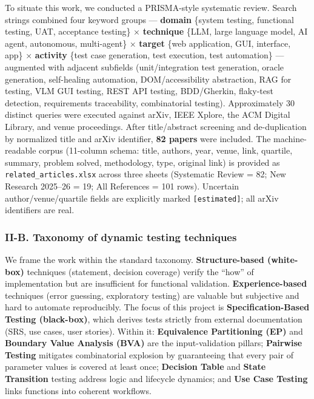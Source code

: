 \documentclass[
]{article}
\begin{document}
To situate this work, we conducted a PRISMA-style systematic review.
Search strings combined four keyword groups --- \textbf{domain} \{system
testing, functional testing, UAT, acceptance testing\} ×
\textbf{technique} \{LLM, large language model, AI agent, autonomous,
multi-agent\} × \textbf{target} \{web application, GUI, interface, app\}
× \textbf{activity} \{test case generation, test execution, test
automation\} --- augmented with adjacent subfields (unit/integration
test generation, oracle generation, self-healing automation,
DOM/accessibility abstraction, RAG for testing, VLM GUI testing, REST
API testing, BDD/Gherkin, flaky-test detection, requirements
traceability, combinatorial testing). Approximately 30 distinct queries
were executed against arXiv, IEEE Xplore, the ACM Digital Library, and
venue proceedings. After title/abstract screening and de-duplication by
normalized title and arXiv identifier, \textbf{82 papers} were included.
The machine-readable corpus (11-column schema: title, authors, year,
venue, link, quartile, summary, problem solved, methodology, type,
original link) is provided as \texttt{related\_articles.xlsx} across
three sheets (Systematic Review = 82; New Research 2025--26 = 19; All
References = 101 rows). Uncertain author/venue/quartile fields are
explicitly marked \texttt{{[}estimated{]}}; all arXiv identifiers are
real.

\subsubsection{II-B. Taxonomy of dynamic testing
techniques}\label{ii-b.-taxonomy-of-dynamic-testing-techniques}

We frame the work within the standard taxonomy. \textbf{Structure-based
(white-box)} techniques (statement, decision coverage) verify the
``how'' of implementation but are insufficient for functional
validation. \textbf{Experience-based} techniques (error guessing,
exploratory testing) are valuable but subjective and hard to automate
reproducibly. The focus of this project is \textbf{Specification-Based
Testing (black-box)}, which derives tests strictly from external
documentation (SRS, use cases, user stories). Within it:
\textbf{Equivalence Partitioning (EP)} and \textbf{Boundary Value
Analysis (BVA)} are the input-validation pillars; \textbf{Pairwise
Testing} mitigates combinatorial explosion by guaranteeing that every
pair of parameter values is covered at least once; \textbf{Decision
Table} and \textbf{State Transition} testing address logic and lifecycle
dynamics; and \textbf{Use Case Testing} links functions into coherent
workflows.
\end{document}
